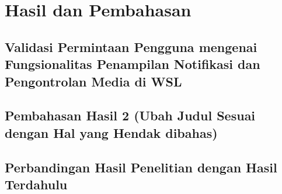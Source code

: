 \chapter{Hasil dan Pembahasan}

\section{Validasi Permintaan Pengguna mengenai Fungsionalitas Penampilan Notifikasi dan Pengontrolan Media di WSL}





\section{Pembahasan Hasil 2 (Ubah Judul Sesuai dengan Hal yang Hendak dibahas)}


\section{Perbandingan Hasil Penelitian dengan Hasil Terdahulu}
